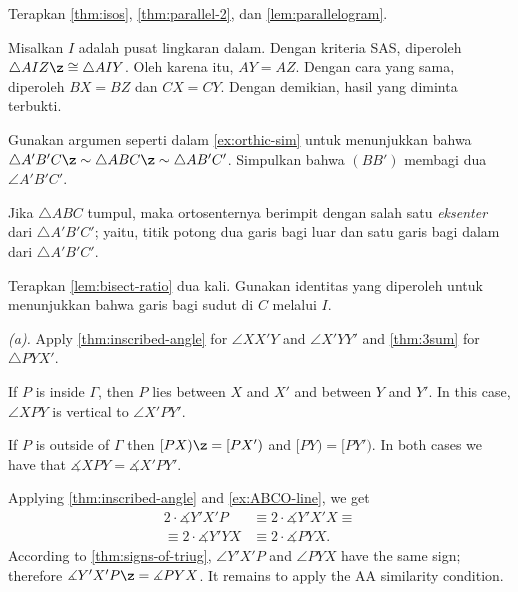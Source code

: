 Terapkan \ref{thm:isos}, \ref{thm:parallel-2}, dan \ref{lem:parallelogram}.

Misalkan $I$ adalah pusat lingkaran dalam.
Dengan kriteria SAS, diperoleh $\triangle AIZ\z\cong\triangle AIY$.
Oleh karena itu, $AY=AZ$.
Dengan cara yang sama, diperoleh $BX=BZ$ dan $CX=CY$.
Dengan demikian, hasil yang diminta terbukti.

Gunakan argumen seperti dalam \ref{ex:orthic-sim} untuk menunjukkan bahwa $\triangle A'B'C\z\sim \triangle ABC\z\sim\triangle AB'C'$.
Simpulkan bahwa $(BB')$ membagi dua $\angle A'B'C'$.

Jika $\triangle ABC$ tumpul, maka ortosenternya berimpit dengan salah satu \emph{eksenter} dari $\triangle A'B'C'$;
yaitu,
titik potong dua garis bagi luar dan satu garis bagi dalam dari $\triangle A'B'C'$.

Terapkan \ref{lem:bisect-ratio} dua kali.
Gunakan identitas yang diperoleh untuk menunjukkan bahwa garis bagi sudut di $C$ melalui $I$.

\setcounter{eqtn}{0}

 \textit{(a).}
Apply \ref{thm:inscribed-angle} for $\angle XX'Y$ and $\angle X'YY'$
and \ref{thm:3sum} for $\triangle PYX'$.

 If $P$ is inside $\Gamma$, then $P$ lies between $X$ and $X'$ and between $Y$ and $Y'$.
In this case, $\angle XPY$ is vertical to $\angle X'PY'$.

If $P$ is outside of $\Gamma$ then $[PX)\z=[PX')$ and $[PY)=[PY')$.
In both cases we have that $\measuredangle XPY=\measuredangle X'PY'$.

Applying \ref{thm:inscribed-angle} and \ref{ex:ABCO-line}, we get
\pagebreak[0]
\begin{align*}
2\cdot \measuredangle Y'X'P
&\equiv
2\cdot \measuredangle Y'X'X\equiv 
\\
\equiv
2\cdot\measuredangle Y'YX
&\equiv
2\cdot\measuredangle PYX.
\end{align*}
According to \ref{thm:signs-of-triug}, $\angle Y'X'P$ and $\angle PYX$ have the same sign;
therefore
$\measuredangle Y'X'P\z= \measuredangle PYX$.
It remains to apply the AA similarity condition.

